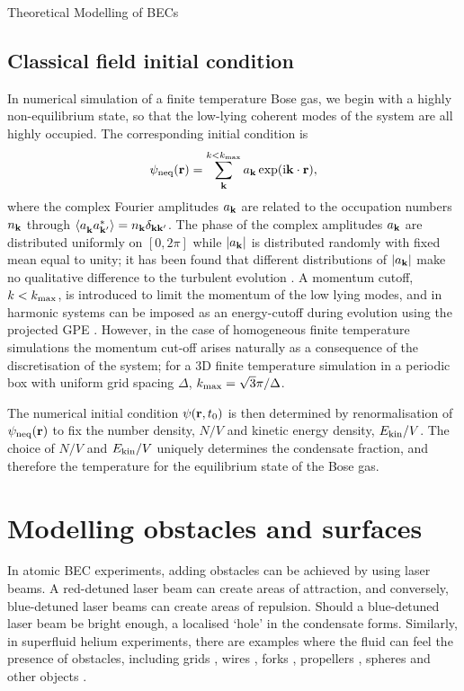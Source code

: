 \begin{chapter}{\label{cha:theoretical_model}Theoretical Modelling of BECs}
\subsection{\label{section:cfieldinitcond} Classical field initial condition}
	In numerical simulation of a finite temperature Bose gas, we begin with a highly non-equilibrium state, so that the low-lying coherent modes of the system are all highly occupied. The corresponding initial condition is
	\begin{equation}
	\psi_{\rm neq}({\bf r}) = \sum \limits_{\bf k}^{k<k_{\rm max}} a_{\bf k} \exp (\mathrm{i}{\bf k}\cdot{\bf r}),
	\label{eq:cFieldIC}
	\end{equation}
	where the complex Fourier amplitudes $a_{\bf k}$ are related to the occupation numbers $n_{\bf k}$ through $\braket{a_{\bf k}^{\,}a_{\bf k'}^*} = n_{\bf k}\delta_{\bf kk'}$. The phase of the complex amplitudes $a_{\bf k}$ are distributed uniformly on $[0,2\pi]$ while $|a_{\bf k}|$ is distributed randomly with fixed mean equal to unity; it has been found that different distributions of $|a_{\bf k}|$ make no qualitative difference to the turbulent evolution \cite{PhysRevA.66.013603}. A momentum cutoff, $k<k_{\rm max}$, is introduced to limit the momentum of the low lying modes, and in harmonic systems can be imposed as an energy-cutoff during evolution using the projected GPE \cite{PhysRevLett.87.160402}. However, in the case of homogeneous finite temperature simulations the momentum cut-off arises naturally as a consequence of the discretisation of the system; for a 3D finite temperature simulation in a periodic box with uniform grid spacing $\Delta$, $k_{\rm max}=\sqrt{3} \pi / \Delta$.

	The numerical initial condition $\psi({\bf r},t_0)$ is then determined by renormalisation of $\psi_{\rm neq}({\bf r})$ to fix the number density, $N/V$ and kinetic energy density, $E_{\rm kin}/V$. The choice of $N/V$ and $E_{\rm kin}/V$ uniquely determines the condensate fraction, and therefore the temperature for the equilibrium state of the Bose gas.

\section{\label{section:potentials}Modelling obstacles and surfaces}
In atomic BEC experiments, adding obstacles can be achieved by using laser beams. A red-detuned laser beam can create areas of attraction, and conversely, blue-detuned laser beams can create areas of repulsion. Should a blue-detuned laser beam be bright enough, a localised `hole' in the condensate forms. Similarly, in superfluid helium experiments, there are examples where the fluid can feel the presence of obstacles, including grids \cite{Davis2000}, wires \cite{Guenault1986,Bradley2005,Bradley2011,Fisher2001}, forks \cite{Blaauwgeers2007,Bradley2012}, propellers \cite{Tabeling,Salort}, spheres \cite{Schoepe1995} and other objects \cite{VinenSkrbek2008}.


\end{chapter}
